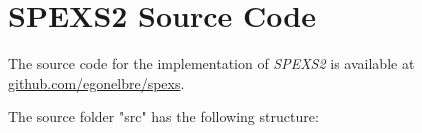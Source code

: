 \chapter{SPEXS2 Source Code}
\label{add:files}

The source code for the implementation of \emph{SPEXS2} is 
available at \url{github.com/egonelbre/spexs}.

The source folder "src" has the following structure:


%
